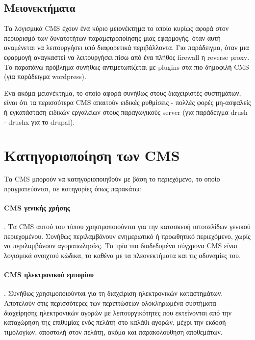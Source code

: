 \documentclass[12pt]{report}
\begin{document}
\subsection{Μειονεκτήματα}
Τα λογισμικά \textlatin{CMS} έχουν ένα κύριο μειονέκτημα το οποίο κυρίως αφορά στον περιορισμό των δυνατοτήτων παραμετροποίησης μιας εφαρμογής, όταν αυτή αναμένεται να λειτουργήσει υπό διαφορετικά περιβάλλοντα. Για παράδειγμα, όταν μια εφαρμογή αναγκαστεί να λειτουργήσει πίσω από ένα πλήθος \textlatin{firewall} η \textlatin{reverse proxy}. Το παραπάνω πρόβλημα συνήθως αντιμετωπίζεται με \textlatin{plugins} στα πιο δημοφιλή \textlatin{CMS} (για παράδειγμα \textlatin{wordpress}).

Ένα ακόμα μειονέκτημα, το οποίο αφορά συνήθως στους διαχειριστές συστημάτων, είναι ότι τα περισσότερα \textlatin{CMS} απαιτούν ειδικές ρυθμίσεις - πολλές φορές μη-ασφαλείς ή εγκατάσταση ειδικών εργαλείων στους παραγωγικούς \textlatin{server} (για παράδειγμα \textlatin{drush - drushx} για το \textlatin{drupal}).

\section{Κατηγοριοποίηση των \textlatin{CMS}}
Τα \textlatin{CMS} μπορούν να κατηγοριοποιηθούν με βάση το περιεχόμενο, το οποίο πραγματεύονται, σε κατηγορίες όπως παρακάτω:

\paragraph{\textlatin{CMS} γενικής χρήσης}. Τα \textlatin{CMS} αυτού του τύπου χρησιμοποιούνται για την κατασκευή ιστοσελίδων γενικού περιεχομένου. Συνήθως περιλαμβάνουν ενημερωτικό ή προωθητικό περιεχόμενο, χωρίς να περιλαμβάνουν αγοραπωλησίες. Τα τρία πιο διαδεδομένα σύγχρονα \textlatin{CMS} είναι λογισμικά ανοιχτού κώδικα, το καθένα με τα πλεονεκτήματα και τις αδυναμίες του.

\paragraph{\textlatin{CMS} ηλεκτρονικού εμπορίου}. Συνήθως χρησιμοποιούνται για τη διαχείριση ηλεκτρονικών καταστημάτων. Αποτελούν στις περισσότερες των περιπτώσεων ολοκληρωμένα συστήματα διαχείρησης ηλεκτρονικών αγορών με λειτουργικότητες που εκτείνονται από την καταχώρηση της επιθυμίας ενός πελάτη στο καλάθι αγορών, μέχρι την εκδοσή τιμολογίων, αποστολή στον πελάτη, ακόμα και παρακολούθηση αποθεμάτων.
\end{document}
